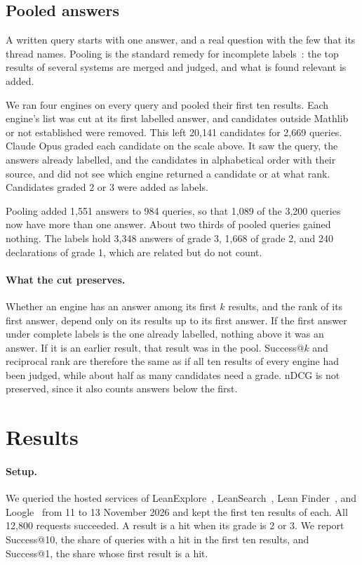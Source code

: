 \documentclass{article}
\begin{document}
\subsection{Pooled answers}
\label{sec:pooling}

A written query starts with one answer, and a real question with the few
that its thread names. Pooling is the standard remedy for incomplete
labels~\cite{sparckjones1975pooling,voorhees2005trec}: the top results of
several systems are merged and judged, and what is found relevant is added.

We ran four engines on every query and pooled their first ten results. Each
engine's list was cut at its first labelled answer, and candidates outside
Mathlib or not established were removed. This left 20,141 candidates for
2,669 queries. Claude Opus graded each candidate on the scale above. It saw
the query, the answers already labelled, and the candidates in alphabetical
order with their source, and did not see which engine returned a candidate or
at what rank. Candidates graded 2 or 3 were added as labels.

Pooling added 1,551 answers to 984 queries, so that 1,089 of the 3,200
queries now have more than one answer. About two thirds of pooled queries
gained nothing. The labels hold 3,348 answers of grade 3, 1,668 of grade 2,
and 240 declarations of grade 1, which are related but do not count.

\paragraph{What the cut preserves.} Whether an engine has an answer among its
first $k$ results, and the rank of its first answer, depend only on its
results up to its first answer. If the first answer under complete labels is
the one already labelled, nothing above it was an answer. If it is an earlier
result, that result was in the pool. Success@$k$ and reciprocal rank are
therefore the same as if all ten results of every engine had been judged,
while about half as many candidates need a grade. nDCG is not preserved,
since it also counts answers below the first.

\section{Results}
\label{sec:results}

\paragraph{Setup.} We queried the hosted services of
LeanExplore~\cite{asher2025leanexplore},
LeanSearch~\cite{gao2026leansearchv2}, Lean Finder~\cite{lu2025leanfinder},
and Loogle~\cite{breitner2023loogle} from 11 to 13 November 2026 and kept the
first ten results of each. All 12,800 requests succeeded. A result is a hit
when its grade is 2 or 3. We report Success@10, the share of queries with a
hit in the first ten results, and Success@1, the share whose first result is a
hit.
\end{document}
